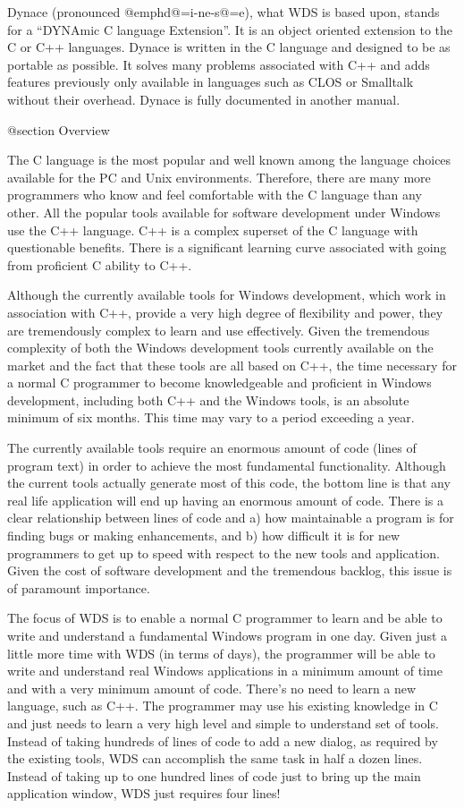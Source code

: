 Dynace (pronounced @emph{d@=i-ne-s@=e}), what WDS is based upon, stands
for a ``DYNAmic C language Extension''.  It is an object oriented
extension to the C or C++ languages.  Dynace is written in the C
language and designed to be as portable as possible.  It solves many
problems associated with C++ and adds features previously only available
in languages such as CLOS or Smalltalk without their overhead.  Dynace
is fully documented in another manual.

@section Overview

The C language is the most popular and well known among the language
choices available for the PC and Unix environments.  Therefore, there
are many more programmers who know and feel comfortable with the C
language than any other.  All the popular tools available for software
development under Windows use the C++
language. C++ is a complex superset of the C language with questionable
benefits.  There is a significant learning curve associated with going
from proficient C ability to C++.


Although the currently available tools for Windows development, which
work in association with C++, provide a very high degree of flexibility
and power, they are tremendously complex to learn and use effectively.
Given the tremendous complexity of both the Windows development tools
currently available on the market and the fact that these tools are all
based on C++, the time necessary for a normal C programmer to become
knowledgeable and proficient in Windows development, including both C++
and the Windows tools, is an absolute minimum of six months.  This time
may vary to a period exceeding a year.

The currently available tools require an enormous amount of code (lines
of program text) in order to achieve the most fundamental functionality.
Although the current tools actually generate most of this code, the
bottom line is that any real life application will end up having an
enormous amount of code.  There is a clear relationship between lines of
code and a) how maintainable a program is for finding bugs or making
enhancements, and b) how difficult it is for new programmers to get up
to speed with respect to the new tools and application.  Given the cost
of software development and the tremendous backlog, this issue is of
paramount importance.

The focus of WDS is to enable a normal C programmer to learn and be able
to write and understand a fundamental Windows program in one day.  Given
just a little more time with WDS (in terms of days), the programmer will
be able to write and understand real Windows applications in a minimum
amount of time and with a very minimum amount of code.  There's no need
to learn a new language, such as C++.  The programmer may use his
existing knowledge in C and just needs to learn a very high level and
simple to understand set of tools.  Instead of taking hundreds of lines
of code to add a new dialog, as required by the existing tools, WDS can
accomplish the same task in half a dozen lines.  Instead of taking up to
one hundred lines of code just to bring up the main application window,
WDS just requires four lines!

